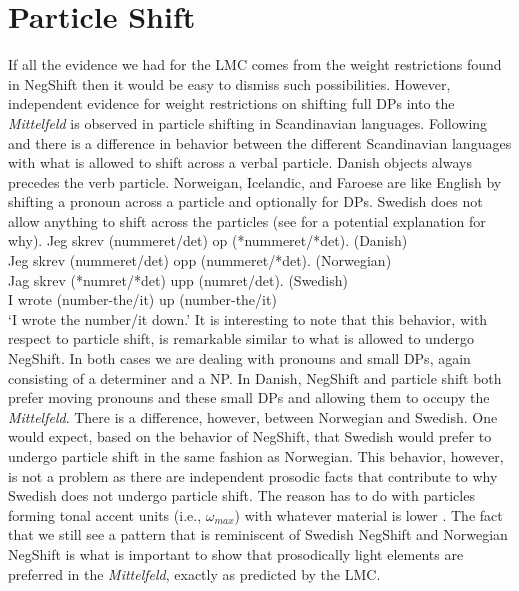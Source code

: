 \documentclass[12pt, letterpaper]{article}
\begin{document}
\section{Particle Shift} \label{sec:ParticleShift}

If all the evidence we had for the LMC comes from the weight restrictions found in NegShift then it would be easy to dismiss such possibilities. However, independent evidence for weight restrictions on shifting full DPs into the \emph{Mittelfeld} is observed in particle shifting in Scandinavian languages. Following \citet[2]{holmbergRemarksHolmbergGeneralization1999} and \citet{faarlundSyntaxMainlandScandinavian2019} there is a difference in behavior between the different Scandinavian languages with what is allowed to shift across a verbal particle. Danish objects always precedes the verb particle. Norweigan, Icelandic, and Faroese are like English by shifting a pronoun across a particle and optionally for DPs. Swedish does not allow anything to shift across the particles (see \cite{erteschik-shirVariationMainlandScandinavian2020} for a potential explanation for why).
\ea \gllll Jeg skrev (nummeret/det) op (*nummeret/*det). \hfill (Danish)\\
		Jeg skrev (nummeret/det) opp (nummeret/*det). \hfill (Norwegian)\\
		Jag skrev (*numret/*det) upp (numret/det). \hfill (Swedish)\\
		I wrote (number-the/it) up (number-the/it)\\
\glt `I wrote the number/it down.'
\z 
It is interesting to note that this behavior, with respect to particle shift, is remarkable similar to what is allowed to undergo NegShift. In both cases we are dealing with pronouns and small DPs, again consisting of a determiner and a NP. In Danish, NegShift and particle shift both prefer moving pronouns and these small DPs and allowing them to occupy the \emph{Mittelfeld}. There is a difference, however, between Norwegian and Swedish. One would expect, based on the behavior of NegShift, that Swedish would prefer to undergo particle shift in the same fashion as Norwegian. This behavior, however, is not a problem as there are independent prosodic facts that contribute to why Swedish does not undergo particle shift. The reason has to do with particles forming tonal accent units (i.e., $\omega_{max}$) with whatever material is lower \citep[see]{erteschik-shirVariationMainlandScandinavian2020}. The fact that we still see a pattern that is reminiscent of Swedish NegShift and Norwegian NegShift is what is important to show that prosodically light elements are preferred in the \emph{Mittelfeld}, exactly as predicted by the LMC. 
\end{document}
